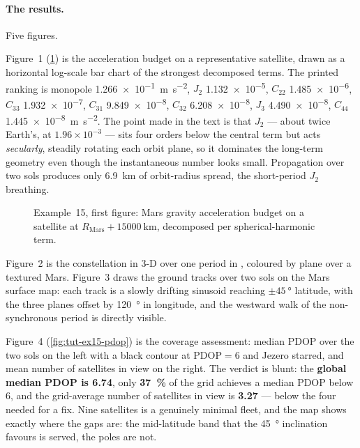 \paragraph{The results.}
Five figures.

Figure~1 (\cref{fig:tut-ex15-acc}) is the acceleration budget on a
representative satellite, drawn as a horizontal log-scale bar chart of the
strongest decomposed terms. The printed ranking is monopole
\SI{1.266e-1}{\meter\per\second\squared}, $J_2$
\SI{1.132e-5}{}, $C_{22}$ \SI{1.485e-6}{}, $C_{33}$
\SI{1.932e-7}{}, $C_{31}$ \SI{9.849e-8}{}, $C_{32}$
\SI{6.208e-8}{}, $J_3$ \SI{4.490e-8}{}, $C_{44}$
\SI{1.445e-8}{\meter\per\second\squared}. The point made in the text is that
$J_2$ --- about twice Earth's, at $1.96\times10^{-3}$ --- sits four orders below
the central term but acts \emph{secularly}, steadily rotating each orbit plane,
so it dominates the long-term geometry even though the instantaneous number
looks small. Propagation over two sols produces only \SI{6.9}{\kilo\meter} of
orbit-radius spread, the short-period $J_2$ breathing.

\begin{figure}[htbp]
  \centering
  \caption{Example~15, first figure: Mars gravity acceleration budget on a
           satellite at $R_\mathrm{Mars}+\SI{15000}{\kilo\meter}$, decomposed
           per spherical-harmonic term.}
  \label{fig:tut-ex15-acc}
\end{figure}

Figure~2 is the constellation in 3-D over one period in ,
coloured by plane over a textured Mars. Figure~3 draws the ground tracks over
two sols on the Mars surface map: each track is a slowly drifting sinusoid
reaching $\pm\SI{45}{\degree}$ latitude, with the three planes offset by
\SI{120}{\degree} in longitude, and the westward walk of the non-synchronous
period is directly visible.

Figure~4 (\cref{fig:tut-ex15-pdop}) is the coverage assessment: median PDOP over
the two sols on the left with a black contour at $\mathrm{PDOP}=6$ and Jezero
starred, and mean number of satellites in view on the right. The verdict is
blunt: the \textbf{global median PDOP is 6.74}, only \textbf{\SI{37}{\percent}}
of the grid achieves a median PDOP below 6, and the grid-average number of
satellites in view is \textbf{3.27} --- below the four needed for a fix. Nine
satellites is a genuinely minimal fleet, and the map shows exactly where the
gaps are: the mid-latitude band that the \SI{45}{\degree} inclination favours is
served, the poles are not.

